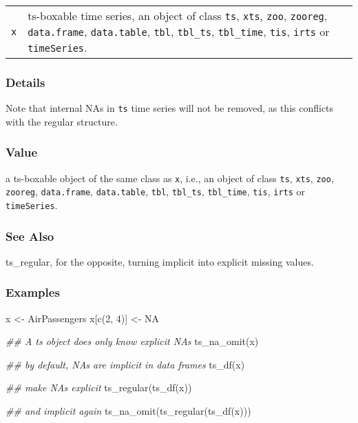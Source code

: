 \documentclass[
  letterpaper,
  DIV=11,
  numbers=noendperiod]{scrreport}
\newenvironment{Shaded}{\begin{snugshade}}{\end{snugshade}}
\newcommand{\ConstantTok}[1]{\textcolor[rgb]{0.56,0.35,0.01}{#1}}
\newcommand{\DecValTok}[1]{\textcolor[rgb]{0.68,0.00,0.00}{#1}}
\newcommand{\DocumentationTok}[1]{\textcolor[rgb]{0.37,0.37,0.37}{\textit{#1}}}
\newcommand{\FunctionTok}[1]{\textcolor[rgb]{0.28,0.35,0.67}{#1}}
\newcommand{\NormalTok}[1]{\textcolor[rgb]{0.00,0.23,0.31}{#1}}
\newcommand{\OtherTok}[1]{\textcolor[rgb]{0.00,0.23,0.31}{#1}}
\begin{document}
\begin{longtable}[]{@{}ll@{}}
\toprule\noalign{}
\endhead
\bottomrule\noalign{}
\endlastfoot
\texttt{x} & ts-boxable time series, an object of class \texttt{ts},
\texttt{xts}, \texttt{zoo}, \texttt{zooreg}, \texttt{data.frame},
\texttt{data.table}, \texttt{tbl}, \texttt{tbl\_ts}, \texttt{tbl\_time},
\texttt{tis}, \texttt{irts} or \texttt{timeSeries}. \\
\end{longtable}

\subsubsection{Details}\label{details-5}

Note that internal NAs in \texttt{ts} time series will not be removed,
as this conflicts with the regular structure.

\subsubsection{Value}\label{value-11}

a ts-boxable object of the same class as \texttt{x}, i.e., an object of
class \texttt{ts}, \texttt{xts}, \texttt{zoo}, \texttt{zooreg},
\texttt{data.frame}, \texttt{data.table}, \texttt{tbl},
\texttt{tbl\_ts}, \texttt{tbl\_time}, \texttt{tis}, \texttt{irts} or
\texttt{timeSeries}.

\subsubsection{See Also}\label{see-also}

ts\_regular, for the opposite, turning implicit into explicit missing
values.

\subsubsection{Examples}\label{examples-11}

\begin{Shaded}
\begin{Highlighting}[]
\NormalTok{x }\OtherTok{\textless{}{-}}\NormalTok{ AirPassengers}
\NormalTok{x[}\FunctionTok{c}\NormalTok{(}\DecValTok{2}\NormalTok{, }\DecValTok{4}\NormalTok{)] }\OtherTok{\textless{}{-}} \ConstantTok{NA}

\DocumentationTok{\#\# A ts object does only know explicit NAs}
\FunctionTok{ts\_na\_omit}\NormalTok{(x)}

\DocumentationTok{\#\# by default, NAs are implicit in data frames}
\FunctionTok{ts\_df}\NormalTok{(x)}

\DocumentationTok{\#\# make NAs explicit}
\FunctionTok{ts\_regular}\NormalTok{(}\FunctionTok{ts\_df}\NormalTok{(x))}

\DocumentationTok{\#\# and implicit again}
\FunctionTok{ts\_na\_omit}\NormalTok{(}\FunctionTok{ts\_regular}\NormalTok{(}\FunctionTok{ts\_df}\NormalTok{(x)))}
\end{Highlighting}
\end{Shaded}
\end{document}
